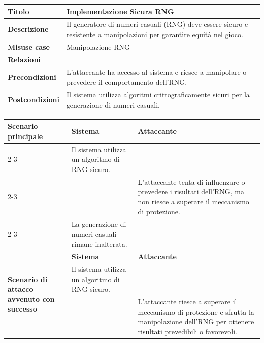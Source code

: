 \documentclass[a4paper, 11pt]{article}
\begin{document}
\clearpage
\begin{table}[h]\small
\begin{center}
\begin{tabular}{ |p{4cm}|p{11cm}|  }
\hline
\textbf{Titolo} & Implementazione Sicura RNG \\
\hline
\textbf{Descrizione} & Il generatore di numeri casuali (RNG) deve essere sicuro e resistente a manipolazioni per garantire equità nel gioco. \\
\hline
\textbf{Misuse case} & Manipolazione RNG \\
\hline
\textbf{Relazioni} &  \\
\hline
\textbf{Precondizioni} &L'attaccante ha accesso al sistema e riesce a manipolare o prevedere il comportamento dell'RNG.\\
\hline
\textbf{Postcondizioni} & Il sistema utilizza algoritmi crittograficamente sicuri per la generazione di numeri casuali.  \\
\hline
\end{tabular}
    \begin{tabular}{|p{4cm}|p{4.9cm}|p{5cm}|}
        \multirow{5}{=}{\textbf{Scenario principale}} & \textbf{Sistema} & \textbf{Attaccante}\\\cline{2-3}
        & Il sistema utilizza un algoritmo di RNG sicuro. &\\\cline{2-3}
        & & L'attaccante tenta di influenzare o prevedere i risultati dell'RNG, ma non riesce a superare il meccanismo di protezione.\\\cline{2-3}
        & La generazione di numeri casuali rimane inalterata. &\\
        \hline
        \multirow{5}{=}{\textbf{Scenario di attacco avvenuto con successo}} & \textbf{Sistema} & \textbf{Attaccante}\\\cline{2-3}
        & Il sistema utilizza un algoritmo di RNG sicuro. & \\\cline{2-3}
        & & L'attaccante riesce a superare il meccanismo di protezione e sfrutta la manipolazione dell'RNG per ottenere risultati prevedibili o favorevoli. \\
    \hline
    \end{tabular}
\end{center}
\end{table}
\end{document}

